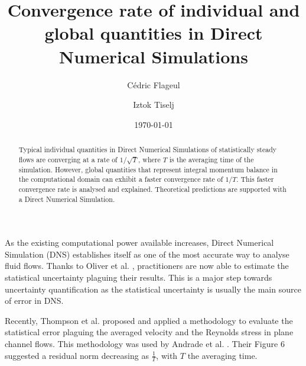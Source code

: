 \documentclass[aip,pof,reprint]{revtex4-1}
\begin{document}
\title{Convergence rate of individual and global quantities in Direct Numerical Simulations} %

\author{C\'edric Flageul}
\author{Iztok Tiselj}

\date{\today}

\begin{abstract}
Typical individual quantities in Direct Numerical Simulations of statistically steady flows are converging at a rate of $1/\sqrt{T}$, where $T$ is the averaging time of the simulation.
However, global quantities that represent integral momentum balance in the computational domain can exhibit a faster convergence rate of $1/T$.
This faster convergence rate is analysed and explained.
Theoretical predictions are supported with a Direct Numerical Simulation.
\end{abstract}



\maketitle %

As the existing computational power available increases, Direct Numerical Simulation (DNS) establishes itself as one of the most accurate way to analyse fluid flows.
Thanks to Oliver et al. \cite{oliver}, practitioners are now able to estimate the statistical uncertainty plaguing their results.
This is a major step towards uncertainty quantification as the statistical uncertainty is usually the main source of error in DNS.

Recently, Thompson et al. \cite{thompson} proposed and applied a methodology to evaluate the statistical error plaguing the averaged velocity and the Reynolds stress in plane channel flows.
This methodology was used by Andrade et al. \cite{andrade}.
Their Figure 6 suggested a residual norm decreasing as $\frac{1}{T}$, with $T$ the averaging time.
\end{document}
